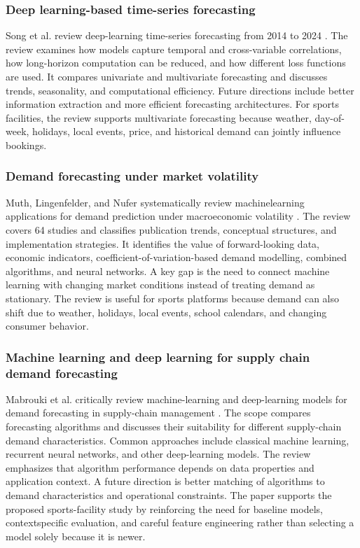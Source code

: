 \subsubsection{Deep learning-based time-series forecasting}
Song et al. review deep-learning time-series forecasting from 2014 to 2024 \cite{r21}. The review examines how models capture temporal and cross-variable correlations, how long-horizon computation can be reduced, and how different loss functions are used. It compares univariate and multivariate forecasting and discusses trends, seasonality, and computational efficiency. Future directions include better information extraction and more efficient forecasting architectures. For sports facilities, the review supports multivariate forecasting because weather, day-of-week, holidays, local events, price, and historical demand can jointly influence bookings.

\subsubsection{Demand forecasting under market volatility}
Muth, Lingenfelder, and Nufer systematically review machinelearning applications for demand prediction under macroeconomic volatility \cite{r22}. The review covers 64 studies and classifies publication trends, conceptual structures, and implementation strategies. It identifies the value of forward-looking data, economic indicators, coefficient-of-variation-based demand modelling, combined algorithms, and neural networks. A key gap is the need to connect machine learning with changing market conditions instead of treating demand as stationary. The review is useful for sports platforms because demand can also shift due to weather, holidays, local events, school calendars, and changing consumer behavior.

\subsubsection{Machine learning and deep learning for supply chain demand forecasting}
Mabrouki et al. critically review machine-learning and deep-learning models for demand forecasting in supply-chain management \cite{r23}. The scope compares forecasting algorithms and discusses their suitability for different supply-chain demand characteristics. Common approaches include classical machine learning, recurrent neural networks, and other deep-learning models. The review emphasizes that algorithm performance depends on data properties and application context. A future direction is better matching of algorithms to demand characteristics and operational constraints. The paper supports the proposed sports-facility study by reinforcing the need for baseline models, contextspecific evaluation, and careful feature engineering rather than selecting a model solely because it is newer.

